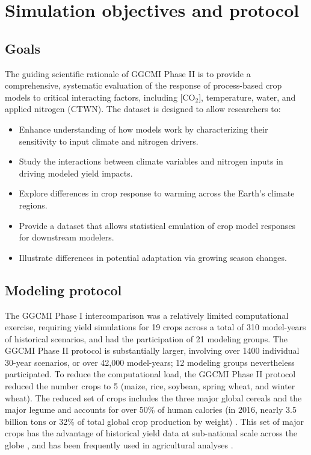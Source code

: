 \documentclass[gmd, manuscript]{copernicus} %
\begin{document}
{\section{Simulation objectives and protocol}
\label{S:2}
\subsection{Goals}

The guiding scientific rationale of GGCMI Phase II is to provide a comprehensive, systematic evaluation of the response of process-based crop models to critical interacting factors, including [CO$_2$], temperature, water, and applied nitrogen (CTWN). 
The dataset is designed to allow researchers to:
\begin{itemize}
    \item Enhance understanding of how models work by characterizing their sensitivity to input climate and nitrogen drivers.
    \item Study the interactions between climate variables and nitrogen inputs in driving modeled yield impacts. 
    \item Explore differences in crop response to warming across the Earth's climate regions.
    \item Provide a dataset that allows statistical emulation of crop model responses for downstream modelers.
    \item Illustrate differences in potential adaptation via growing season changes. 
\end{itemize}
\vspace{-0.05in}

\subsection{Modeling protocol}

The GGCMI Phase I intercomparison was a relatively limited computational exercise, requiring yield simulations for 19 crops across a total of 310 model-years of historical scenarios, and had the participation of 21 modeling groups.
The GGCMI Phase II protocol is substantially larger, involving over 1400 individual 30-year scenarios, or over 42,000 model-years; 12 modeling groups nevertheless participated. To reduce the computational load, the GGCMI Phase II protocol reduced the number crops to 5 (maize, rice, soybean, spring wheat, and winter wheat). 
The reduced set of crops includes the three major global cereals and the major legume and accounts for over 50\% of human calories (in 2016, nearly 3.5 billion tons or 32\% of total global crop production by weight) \citep{FAOSTAT}. This set of major crops has the advantage of  historical yield data at sub-national scale across the globe \citep{Ray2012,iizumi_historical_2014}, and has been frequently used in agricultural analyses \citep[e.g.][]{muller_global_2017,porwollik_spatial_2016}.  %

}
\end{document}
